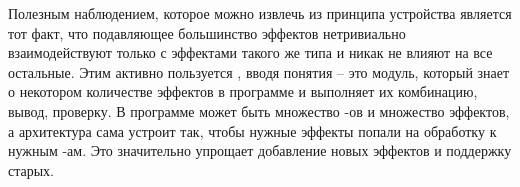 Полезным наблюдением, которое можно извлечь из принципа устройства  является тот факт, что подавляющее большинство эффектов нетривиально взаимодействуют только с эффектами такого же типа и никак не влияют на все остальные. Этим активно пользуется , вводя понятия  -- это модуль, который знает о некотором количестве эффектов в программе и выполняет их комбинацию, вывод, проверку. В программе может быть множество -ов и множество эффектов, а архитектура  сама устроит так, чтобы нужные эффекты попали на обработку к нужным -ам. Это значительно упрощает добавление новых эффектов и поддержку старых.
